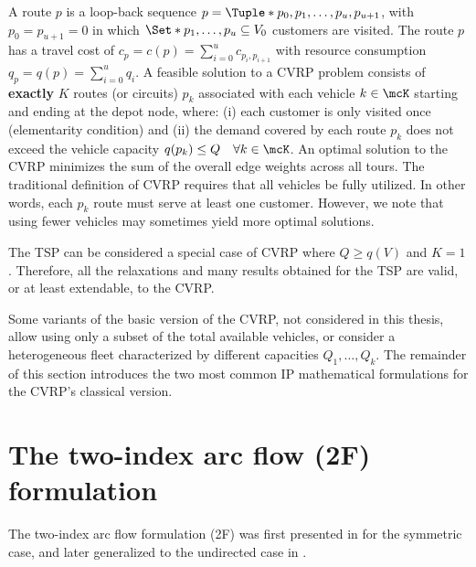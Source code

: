A route $p$ is a loop-back sequence $p = \Tuple*{p_0, p_1, \dots, p_u, p_{u + 1}}$,
with $p_0 = p_{u + 1} = 0$
in which $\Set*{p_1, \dots, p_u} \subseteq V_0$ customers are visited.
The route $p$ has a travel cost of $c_p = c(p) = \sum_{i=0}^{u} c_{p_i,p_{i+1}}$
with resource consumption $q_p = q(p) = \sum_{i=0}^{u} q_{i}$.
A feasible solution to a CVRP problem consists of \textbf{exactly} $K$ routes (or circuits) $p_k$
associated with each vehicle $k \in \mcK$ starting and ending at the depot node,
where:
(i) each customer is only visited once (elementarity condition)
and (ii) the demand covered by each route $p_k$ does not exceed the vehicle capacity $q(p_k) \le Q \quad \forall k \in \mcK$.
An optimal solution to the CVRP minimizes the sum of the overall edge weights across all tours.
The traditional definition of CVRP requires that all vehicles be fully utilized.
In other words, each $p_k$ route must serve at least one customer.
However, we note that using fewer vehicles may sometimes yield more optimal solutions.

\medskip

The TSP can be considered a special case of CVRP where $Q \ge q(V)$ and $K = 1$.
Therefore, all the relaxations and many results obtained for the TSP
are valid, or at least extendable, to the CVRP.

\medskip

Some variants of the basic version of the CVRP,
not considered in this thesis,
allow using only a subset of the total available vehicles,
or consider a heterogeneous fleet characterized by different capacities $Q_1, \dots, Q_k$.
The remainder of this section
introduces the two most common IP mathematical formulations for the CVRP's classical version.

\section{The two-index arc flow (2F) formulation}
\label{sec:cvrp-two-index-flow-formulation}

The two-index arc flow formulation (2F)
was  first presented in \textcite{laporte1983, laporte1985} for the symmetric case,
and later generalized to the undirected case in \textcite{laporte1986}.


